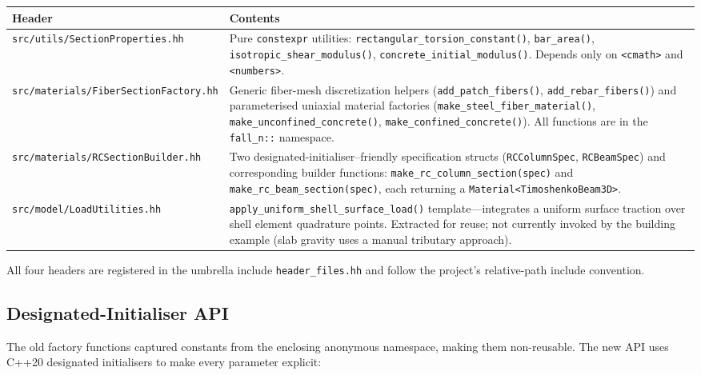 \begin{center}
\small
\begin{tabular}{lp{8cm}}
\toprule
\textbf{Header} & \textbf{Contents} \\
\midrule
\texttt{src/utils/SectionProperties.hh}
  & Pure \texttt{constexpr} utilities:
    \texttt{rectangular\_torsion\_constant()},
    \texttt{bar\_area()},
    \texttt{isotropic\_shear\_modulus()},
    \texttt{concrete\_initial\_modulus()}.
    Depends only on \texttt{<cmath>} and \texttt{<numbers>}. \\
\addlinespace
\texttt{src/materials/FiberSectionFactory.hh}
  & Generic fiber-mesh discretization helpers
    (\texttt{add\_patch\_fibers()}, \texttt{add\_rebar\_fibers()})
    and parameterised uniaxial material factories
    (\texttt{make\_steel\_fiber\_material()},
     \texttt{make\_unconfined\_concrete()},
     \texttt{make\_confined\_concrete()}).
    All functions are in the \texttt{fall\_n::} namespace.  \\
\addlinespace
\texttt{src/materials/RCSectionBuilder.hh}
  & Two designated-initialiser--friendly specification structs
    (\texttt{RCColumnSpec}, \texttt{RCBeamSpec}) and corresponding
    builder functions:
    \texttt{make\_rc\_column\_section(spec)} and
    \texttt{make\_rc\_beam\_section(spec)}, each returning a
    \texttt{Material<TimoshenkoBeam3D>}. \\
\addlinespace
\texttt{src/model/LoadUtilities.hh}
  & \texttt{apply\_uniform\_shell\_surface\_load()} template---integrates
    a uniform surface traction over shell element quadrature points.
    Extracted for reuse; not currently invoked by the building example
    (slab gravity uses a manual tributary approach). \\
\bottomrule
\end{tabular}
\end{center}

All four headers are registered in the umbrella include
\texttt{header\_files.hh} and follow the project's relative-path
include convention.

\subsection{Designated-Initialiser API}
\label{sec:phase2-designated-init}

The old factory functions captured constants from the enclosing
anonymous namespace, making them non-reusable.  The new API uses
C++20 designated initialisers to make every parameter explicit:

